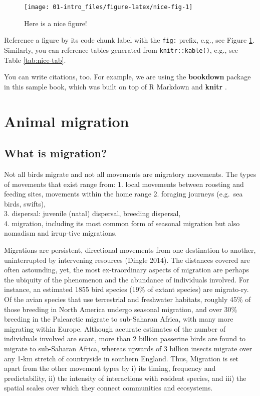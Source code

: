 \documentclass[
]{book}
\begin{document}
\begin{figure}

{\centering \texttt{[image: 01-intro\_files/figure-latex/nice-fig-1]} 

}

\caption{Here is a nice figure!}\label{fig:nice-fig}
\end{figure}

Reference a figure by its code chunk label with the \texttt{fig:} prefix, e.g., see Figure \ref{fig:nice-fig}. Similarly, you can reference tables generated from \texttt{knitr::kable()}, e.g., see Table \ref{tab:nice-tab}.

You can write citations, too. For example, we are using the \textbf{bookdown} package \citep{R-bookdown} in this sample book, which was built on top of R Markdown and \textbf{knitr} \citep{xie2015}.

\hypertarget{animal-migration}{%
\chapter{Animal migration}\label{animal-migration}}

\hypertarget{what-is-migration}{%
\section{What is migration?}\label{what-is-migration}}

Not all birds migrate and not all movements are migratory movements. The types of movements that exist range from:
1. local movements between roosting and feeding sites, movements within the home range
2. foraging journeys (e.g.~sea birds, swifts),\\
3. dispersal: juvenile (natal) dispersal, breeding dispersal,\\
4. migration, including its most common form of seasonal migration but also nomadism and irrup-tive migrations.

Migrations are persistent, directional movements from one destination to another, uninterrupted by intervening resources (Dingle 2014). The distances covered are often astounding, yet, the most ex-traordinary aspects of migration are perhaps the ubiquity of the phenomenon and the abundance of individuals involved. For instance, an estimated 1855 bird species (19\% of extant species) are migrato-ry. Of the avian species that use terrestrial and freshwater habitats, roughly 45\% of those breeding in North America undergo seasonal migration, and over 30\% breeding in the Palearctic migrate to sub-Saharan Africa, with many more migrating within Europe. Although accurate estimates of the number of individuals involved are scant, more than 2 billion passerine birds are found to migrate to sub-Saharan Africa, whereas upwards of 3 billion insects migrate over any 1-km stretch of countryside in southern England. Thus, Migration is set apart from the other movement types by i) its timing, frequency and predictability, ii) the intensity of interactions with resident species, and iii) the spatial scales over which they connect communities and ecosystems.
\end{document}
